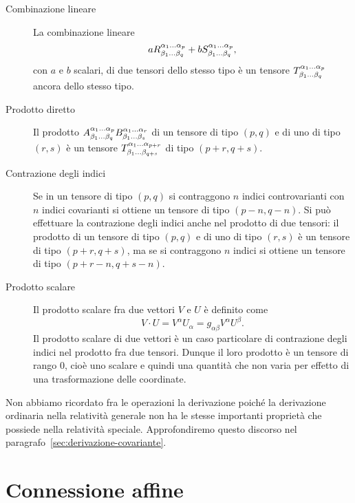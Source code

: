 \begin{description}
\item[Combinazione lineare] La combinazione lineare
  \begin{equation}
    a \tensor*{R}{^{\alpha_{1}\dots\alpha_{p}}_{\beta_{1}\dots\beta_{q}}} + b
    \tensor*{S}{^{\alpha_{1}\dots\alpha_{p}}_{\beta_{1}\dots\beta_{q}}},
  \end{equation}
  con $a$ e $b$ scalari, di due tensori dello stesso tipo è un tensore
  $\tensor*{T}{^{\alpha_{1}\dots\alpha_{p}}_{\beta_{1}\dots\beta_{q}}}$ ancora
  dello stesso tipo.
\item[Prodotto diretto] Il prodotto
  $\tensor*{A}{^{\alpha_{1}\dots\alpha_{p}}_{\beta_{1}\dots\beta_{q}}}
  \tensor*{B}{^{\alpha_{1}\dots\alpha_{r}}_{\beta_{1}\dots\beta_{s}}}$
  di un tensore di tipo $(p,q)$ e di uno di tipo $(r,s)$ è un tensore
  $\tensor*{T}{^{\alpha_{1}\dots\alpha_{p+r}}_{\beta_{1}\dots\beta_{q+s}}}$ di
  tipo $(p+r,q+s)$.
\item[Contrazione degli indici] Se in un tensore
  di tipo $(p,q)$ si contraggono $n$ indici controvarianti con $n$ indici
  covarianti si ottiene un tensore di tipo $(p-n,q-n)$.  Si può effettuare la
  contrazione degli indici anche nel prodotto di due tensori: il prodotto di un
  tensore di tipo $(p,q)$ e di uno di tipo $(r,s)$ è un tensore di tipo
  $(p+r,q+s)$, ma se si contraggono $n$ indici si ottiene un tensore di tipo
  $(p+r-n,q+s-n)$.
\item[Prodotto scalare] Il prodotto scalare fra due vettori $V$ e $U$ è definito
  come
  \begin{equation}
    V\cdot U = V^{\alpha}U_{\alpha} = g_{\alpha\beta}V^{\alpha}U^{\beta}.
  \end{equation}
  Il prodotto scalare di due vettori è un caso particolare di contrazione degli
  indici nel prodotto fra due tensori.  Dunque il loro prodotto è un tensore di
  rango $0$, cioè uno scalare e quindi una quantità che non varia per effetto di
  una trasformazione delle coordinate.
\end{description}

Non abbiamo ricordato fra le operazioni la derivazione poiché la derivazione
ordinaria nella relatività generale non ha le stesse importanti proprietà che
possiede nella relatività speciale.  Approfondiremo questo discorso nel
paragrafo~\ref{sec:derivazione-covariante}.

\section{Connessione affine}
\label{sec:connessione-affine}

